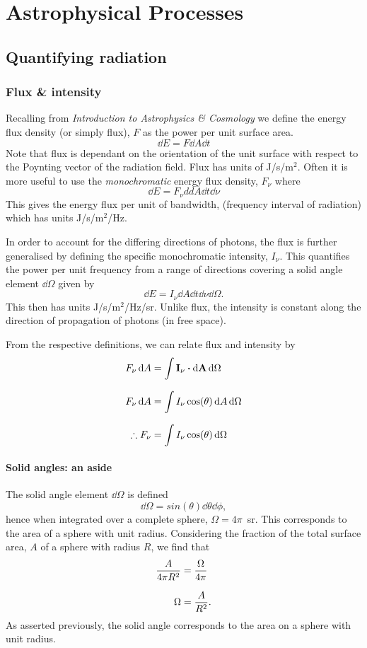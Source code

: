 \chapter{Astrophysical Processes}
\minitoc
\pagebreak
\section{Quantifying radiation}
\subsection{Flux \& intensity}
Recalling from \textit{Introduction to Astrophysics \& Cosmology} we define the energy flux density (or simply flux), \(F\) as the power per unit surface area.
%
\[ \dd{E} = F \dd{A} \dd{t} \]
%
Note that flux is dependant on the orientation of the unit surface with respect to the Poynting vector of the radiation field.
 Flux has units of J/s/m\(^2\).
 Often it is more useful to use the \emph{monochromatic} energy flux density, \(F_\nu\) where
%
\begin{equation}
	\dd{E} = F_\nu dd{A} \dd{t} \dd{\nu}
	\label{eq:AP:def_flux}
\end{equation}
%
This gives the energy flux per unit of bandwidth, (frequency interval of radiation) which has units J/s/m\(^2\)/Hz.
\par 
In order to account for the differing directions of photons, the flux is further generalised by defining the specific monochromatic intensity, \(I_\nu\).
 This quantifies the power per unit frequency from a range of directions covering a solid angle element \(\dd{\Omega}\) given by
%
\begin{equation}
	\dd{E} = I_\nu \dd{A} \dd{t} \dd{\nu} \dd{\Omega}.
	\label{eq:AP:def_intensity}
\end{equation}
%
This then has units J/s/m\(^2\)/Hz/sr.
 Unlike flux, the intensity is constant along the direction of propagation of photons (in free space).
\par
From the respective definitions, we can relate flux and intensity by
%
\begin{align*}
	F_\nu \dd{A} &= \int \vb{I_\nu} \vdot \vb{\dd{A}} \dd{\Omega}
	\linedrop
	F_\nu \dd{A} &= \int I_\nu \cos(\theta) \dd{A} \dd{\Omega}
	\linedrop
	\therefore F_\nu &= \int I_\nu \cos(\theta) \dd{\Omega}
\end{align*}
%
\subsubsection{Solid angles: an aside}
The solid angle element \(\dd{\Omega}\) is defined
%
\[ \dd{\Omega} = sin(\theta) \dd{\theta} \dd{\phi}, \]
%
hence when integrated over a complete sphere, \(\Omega = 4\pi\)~sr.
 This corresponds to the area of a sphere with unit radius.
 Considering the fraction of the total surface area, \(A\) of a sphere with radius \(R\), we find that
%
\begin{align}
	\frac{A}{4\pi R^2} &= \frac{\Omega}{4\pi}
	\linedrop
	\Omega &= \frac{A}{R^2}.
	\label{eq:AP:solid_angle}
\end{align}
%
As asserted previously, the solid angle corresponds to the area on a sphere with unit radius.
%

